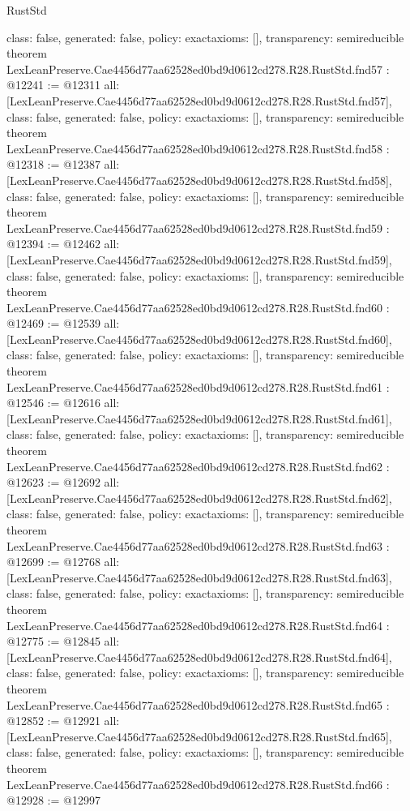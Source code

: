\begin{lexlean}{RustStd}
\begin{coremodule}
{  class: false,
  generated: false,
  policy: exact{axioms: []},
  transparency: semireducible
}
theorem LexLeanPreserve.Cae4456d77aa62528ed0bd9d0612cd278.R28.RustStd.fnd57 : @12241 := @12311 {
  all: [LexLeanPreserve.Cae4456d77aa62528ed0bd9d0612cd278.R28.RustStd.fnd57],
  class: false,
  generated: false,
  policy: exact{axioms: []},
  transparency: semireducible
}
theorem LexLeanPreserve.Cae4456d77aa62528ed0bd9d0612cd278.R28.RustStd.fnd58 : @12318 := @12387 {
  all: [LexLeanPreserve.Cae4456d77aa62528ed0bd9d0612cd278.R28.RustStd.fnd58],
  class: false,
  generated: false,
  policy: exact{axioms: []},
  transparency: semireducible
}
theorem LexLeanPreserve.Cae4456d77aa62528ed0bd9d0612cd278.R28.RustStd.fnd59 : @12394 := @12462 {
  all: [LexLeanPreserve.Cae4456d77aa62528ed0bd9d0612cd278.R28.RustStd.fnd59],
  class: false,
  generated: false,
  policy: exact{axioms: []},
  transparency: semireducible
}
theorem LexLeanPreserve.Cae4456d77aa62528ed0bd9d0612cd278.R28.RustStd.fnd60 : @12469 := @12539 {
  all: [LexLeanPreserve.Cae4456d77aa62528ed0bd9d0612cd278.R28.RustStd.fnd60],
  class: false,
  generated: false,
  policy: exact{axioms: []},
  transparency: semireducible
}
theorem LexLeanPreserve.Cae4456d77aa62528ed0bd9d0612cd278.R28.RustStd.fnd61 : @12546 := @12616 {
  all: [LexLeanPreserve.Cae4456d77aa62528ed0bd9d0612cd278.R28.RustStd.fnd61],
  class: false,
  generated: false,
  policy: exact{axioms: []},
  transparency: semireducible
}
theorem LexLeanPreserve.Cae4456d77aa62528ed0bd9d0612cd278.R28.RustStd.fnd62 : @12623 := @12692 {
  all: [LexLeanPreserve.Cae4456d77aa62528ed0bd9d0612cd278.R28.RustStd.fnd62],
  class: false,
  generated: false,
  policy: exact{axioms: []},
  transparency: semireducible
}
theorem LexLeanPreserve.Cae4456d77aa62528ed0bd9d0612cd278.R28.RustStd.fnd63 : @12699 := @12768 {
  all: [LexLeanPreserve.Cae4456d77aa62528ed0bd9d0612cd278.R28.RustStd.fnd63],
  class: false,
  generated: false,
  policy: exact{axioms: []},
  transparency: semireducible
}
theorem LexLeanPreserve.Cae4456d77aa62528ed0bd9d0612cd278.R28.RustStd.fnd64 : @12775 := @12845 {
  all: [LexLeanPreserve.Cae4456d77aa62528ed0bd9d0612cd278.R28.RustStd.fnd64],
  class: false,
  generated: false,
  policy: exact{axioms: []},
  transparency: semireducible
}
theorem LexLeanPreserve.Cae4456d77aa62528ed0bd9d0612cd278.R28.RustStd.fnd65 : @12852 := @12921 {
  all: [LexLeanPreserve.Cae4456d77aa62528ed0bd9d0612cd278.R28.RustStd.fnd65],
  class: false,
  generated: false,
  policy: exact{axioms: []},
  transparency: semireducible
}
theorem LexLeanPreserve.Cae4456d77aa62528ed0bd9d0612cd278.R28.RustStd.fnd66 : @12928 := @12997 {
}
\end{coremodule}
\end{lexlean}
